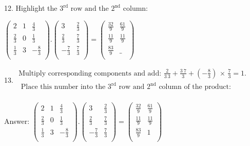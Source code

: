 \documentclass{article}
\begin{document}
12. Highlight the $3^{\text{rd}}\text{ row and the }2^{\text{nd}}$ column:

$\left(
        \begin{array}{ccc}
2           & 1 & \frac{4}{3}  \\
                \frac{2}{3} & 0 & \frac{1}{3}  \\
                \frac{1}{3} & 3 & -\frac{8}{3} \\
            \end{array}
        \right).\left(
        \begin{array}{cc}
3            & \frac{2}{3} \\
                \frac{2}{3}  & \frac{7}{3} \\
                -\frac{7}{3} & \frac{7}{3} \\
            \end{array}
        \right)=\left(
        \begin{array}{cc}
\frac{32}{9} & \frac{61}{9} \\
                \frac{11}{9} & \frac{11}{9} \\
                \frac{83}{9} & \_           \\
            \end{array}
        \right)$

13. $\begin{array}{l}
\text{Multiply corresponding components and add: }\frac{2}{3\ 3}+\frac{3\ 7}{3}+\left(-\frac{8}{3}\right)\, \times \, \frac{7}{3}=1.   \\
\text{            Place this number into the }3^{\text{rd}}\text{ row and }2^{\text{nd}}\text{ column of the product}: \\
        \end{array}$

Answer: $\left(
                    \begin{array}{ccc}
2           & 1 & \frac{4}{3}  \\
                            \frac{2}{3} & 0 & \frac{1}{3}  \\
                            \frac{1}{3} & 3 & -\frac{8}{3} \\
                        \end{array}
                    \right).\left(
                    \begin{array}{cc}
3            & \frac{2}{3} \\
                            \frac{2}{3}  & \frac{7}{3} \\
                            -\frac{7}{3} & \frac{7}{3} \\
                        \end{array}
                    \right)=\left(
                    \begin{array}{cc}
\frac{32}{9} & \frac{61}{9} \\
                            \frac{11}{9} & \frac{11}{9} \\
                            \frac{83}{9} & 1   \\
                        \end{array}
                    \right)$
\end{document}
